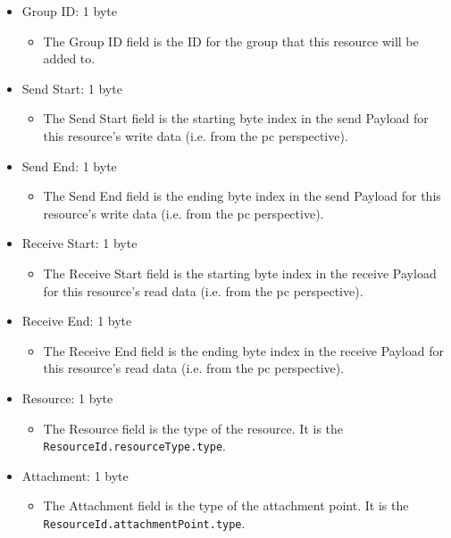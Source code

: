 \documentclass{article}
\begin{document}
\begin{itemize}
    \item Group ID: 1 byte
    \begin{itemize}
        \item The Group ID field is the ID for the \gls{group} that this \gls{resource} will be added to.
    \end{itemize}

    \item Send Start: 1 byte
    \begin{itemize}
        \item The Send Start field is the starting byte index in the send Payload for this
        \gls{resource}'s write data (i.e. from the \gls{pc} perspective).
    \end{itemize}

    \item Send End: 1 byte
    \begin{itemize}
        \item The Send End field is the ending byte index in the send Payload for this \gls{resource}'s
        write data (i.e. from the \gls{pc} perspective).
    \end{itemize}

    \item Receive Start: 1 byte
    \begin{itemize}
        \item The Receive Start field is the starting byte index in the receive Payload for this
        \gls{resource}'s read data (i.e. from the \gls{pc} perspective).
    \end{itemize}

    \item Receive End: 1 byte
    \begin{itemize}
        \item The Receive End field is the ending byte index in the receive Payload for this
        \gls{resource}'s read data (i.e. from the \gls{pc} perspective).
    \end{itemize}

    \item Resource: 1 byte
    \begin{itemize}
        \item The Resource field is the type of the \gls{resource}. It is the \\
        \texttt{ResourceId.resourceType.type}.
    \end{itemize}

    \item Attachment: 1 byte
    \begin{itemize}
        \item The Attachment field is the type of the attachment point. It is the
        \texttt{ResourceId.attachmentPoint.type}.
    \end{itemize}


\end{itemize}
\end{document}
